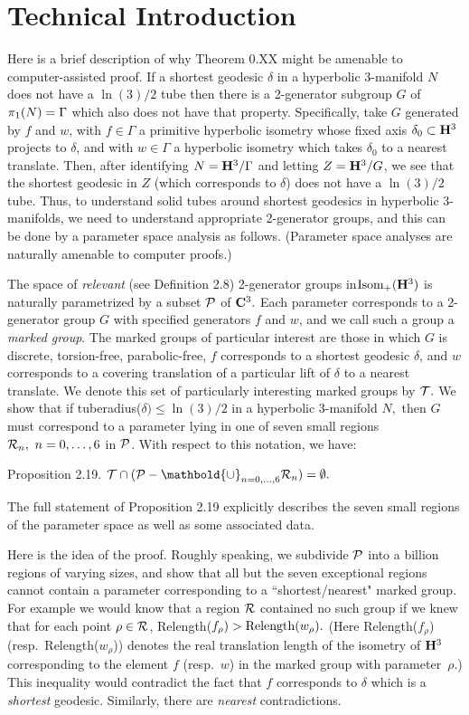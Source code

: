 \section{Technical Introduction}
Here is a brief description of why Theorem 0.XX might be amenable to 
computer-assisted proof.
If a shortest geodesic $\delta$ in a hyperbolic $3$-manifold $N$ does not have 
a $\ln(3)/2$
tube then there is a 2-generator subgroup $G$ of $\pi_1(N)\break =\Gamma$
which also does not have that property.
Specifically, take $G$ generated by $f$ and $w$,
with $f\in \Gamma$ a primitive hyperbolic isometry
whose fixed axis $\delta_0 \subset {\bf H}^3$ projects to $\delta$, and 
with $w\in \Gamma$ a hyperbolic isometry
which takes $\delta_0$ to a nearest translate.
Then, after identifying $N={\bf H}^3/\Gamma$ and letting 
$Z={\bf H}^3/G$,
we see that the shortest geodesic in $Z$ (which corresponds to $\delta$)
does not have 
a $\ln(3)/2$ tube. 
Thus, to understand solid tubes around shortest geodesics in hyperbolic 
$3$-manifolds, we need to understand appropriate 2-generator groups, and this 
can be done by a parameter space analysis as follows.  (Parameter space 
analyses are naturally amenable to 
computer proofs.)

The space of {\it relevant} (see Definition 2.8) 2-generator groups 
in\break ${\rm Isom}_+({\bf H}^3)$ is naturally
parametrized by a subset ${\cal P}$ of ${\bf C}^3.$  
Each parameter corresponds to a
2-generator group $G$ with specified generators $f$ and $w$, and we call 
such a group a {\it marked group}. 
The marked groups of particular interest are those in which $G$ is
discrete, torsion-free, parabolic-free, $f$ corresponds to a shortest
geodesic $\delta$, and $w$ corresponds to a
covering translation of a particular lift of
$\delta$ to a nearest translate.  
We denote this set of particularly interesting marked groups by ${\cal T}.$
We show that if tuberadius($\delta) \le \ln(3)/2$ 
in a hyperbolic $3$-manifold $N,$ then 
$G$ must correspond to a parameter lying in one of seven small regions
${\cal R}_n,\ n=0,\ldots,6$ 
in ${\cal P}$.  
With respect to this notation, we have:

 {\elevensc Proposition 2.19}.
${\cal T} \cap ({\cal P} - \mathbold{\cup}_{n=0,\ldots,6}{\cal R}_n) = \emptyset.$
\vfill

The full statement of Proposition 2.19 explicitly describes the seven small
regions of the parameter space as well as some associated data.

Here is the idea of the proof.
Roughly speaking, we subdivide ${\cal P}$ into a billion regions
of varying sizes,
and show that all but the seven exceptional regions cannot contain 
a parameter corresponding to a  
``shortest/nearest" marked group.
For example we would know that 
a region ${\cal R}$ contained no such group if we knew that for each 
point $\rho\in {\cal R}$,
Relength($f_\rho) > {\rm Relength}(w_\rho).$  
(Here Relength($f_\rho$) (resp.\ Relength($w_\rho^{\phantom{|}}$))
denotes the real translation length of the isometry of ${\bf H}^3$ 
corresponding to
the element $f$ (resp.\ $w$) in the marked group with parameter~$\rho.$)
This inequality would contradict the fact that $f$ corresponds to $\delta$ 
which is a {\it shortest} geodesic.  Similarly, there are {\it nearest}
contradictions.
